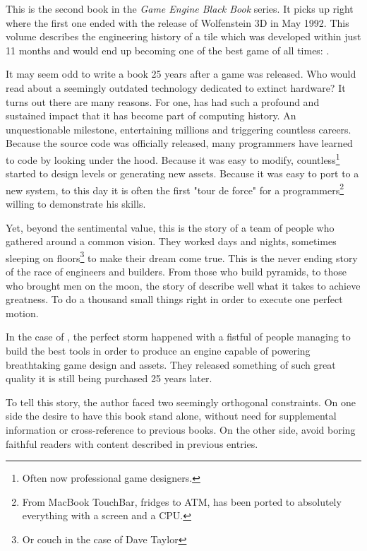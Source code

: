 This is the second book in the \textit{Game Engine Black Book} series. It picks up right where the first one ended with the release of Wolfenstein 3D in May 1992. This volume describes the engineering history of a tile which was developed within just 11 months and would end up becoming one of the best game of all times: \doom.\\
\par
It may seem odd to write a book 25 years after a game was released. Who would read about a seemingly outdated technology dedicated to extinct hardware? It turns out there are many reasons. For one, \doom has had such a profound and sustained impact that it has become part of computing history. An unquestionable milestone, entertaining millions and triggering countless careers. Because the source code was officially released, many programmers have learned to code by looking under the hood. Because it was easy to modify, countless\footnote{Often now professional game designers.} started to design levels or generating new assets. Because it was easy to port to a new system, to this day it is often the first "tour de force" for a programmers\footnote{From MacBook TouchBar, fridges to ATM, \doom has been ported to absolutely everything with a screen and a CPU.} willing to demonstrate his skills.\\
\par
Yet, beyond the sentimental value, this is the story of a team of people who gathered around a common vision. They worked days and nights, sometimes sleeping on floors\footnote{Or couch in the case of Dave Taylor} to make their dream come true. This is the never ending story of the race of engineers and builders. From those who build pyramids, to those who brought men on the moon, the story of \doom describe well what it takes to achieve greatness. To do a thousand small things right in order to execute one perfect motion.\\
\par
In the case of \doom, the perfect storm happened with a fistful of people managing to build the best tools in order to produce an engine capable of powering breathtaking game design and assets. They released something of such great quality it is still being purchased 25 years later.\\
\par
 To tell this story, the author faced two seemingly orthogonal constraints. On one side the desire to have this book stand alone, without need for supplemental information or cross-reference to previous books. On the other side, avoid boring faithful readers with content described in previous entries.\\
